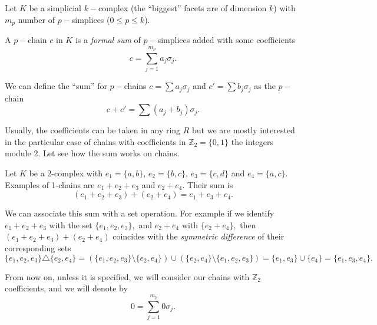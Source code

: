 \documentclass[
	fontsize=10pt, %
	twoside=false, %
	secnumdepth=1, %
]{kaobook}
\begin{document}
Let $K$ be a simplicial $k-$complex (the ``biggest'' facets are of dimension $k$) with $m_p$ number of $p-$simplices ($0\leq p\leq k$).

\begin{definition}
A $p-$chain $c$ in $K$ is a \emph{formal sum} of $p-$simplices added with some coefficients $$c=\sum_{j=1}^{m_p} a_j \sigma_j.$$
\end{definition}

We can define the ``sum'' for $p-$chains $c=\sum a_j \sigma_j$ and $c'=\sum b_j\sigma_j$ as the $p-$chain $$c+c'=\sum (a_j+b_j)\sigma_j.$$

Usually, the coefficients can be taken in any ring $R$ but we are mostly interested in the particular case of chains with coefficients in $\mathbb{Z}_2=\{0,1\}$ the integers module 2. Let see how the sum works on chains.

\begin{example}
Let $K$ be a 2-complex with $e_1=\{a,b\},\,e_2=\{b,c\},\, e_3=\{c,d\}$ and $e_4=\{a,c\}.$ Examples of 1-chains are $e_1+e_2+e_3$ and $e_2+e_4.$ Their sum is $$(e_1+e_2+e_3)+(e_2+e_4)=e_1+e_3+e_4.$$

We can associate this sum with a set operation. For example if we identify $e_1+e_2+e_3$ with the set $\{e_1,e_2,e_3\},$ and $e_2+e_4$ with $\{e_2+e_4\},$ then $(e_1+e_2+e_3)+(e_2+e_4)$ coincides with the \emph{symmetric difference} of their corresponding sets $$\{e_1,e_2,e_3\}\triangle\{e_2,e_4\}=(\{e_1,e_2,e_3\}\setminus\{e_2,e_4\})\cup (\{e_2,e_4\}\setminus \{e_1,e_2,e_3\})=\{e_1,e_3\}\cup\{e_4\}=\{e_1,e_3,e_4\}.$$
\end{example}

From now on, unless it is specified, we will consider our chains with $\mathbb{Z}_2$ coefficients, and we will denote by $$0=\sum_{j=1}^{m_p}0\sigma_j.$$
\end{document}

